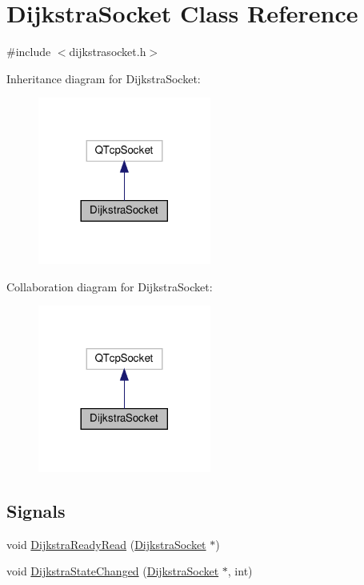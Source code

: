 \hypertarget{class_dijkstra_socket}{}\section{Dijkstra\+Socket Class Reference}
\label{class_dijkstra_socket}


{\ttfamily \#include $<$dijkstrasocket.\+h$>$}



Inheritance diagram for Dijkstra\+Socket\+:
\nopagebreak
\begin{figure}[H]
\begin{center}
\leavevmode
\includegraphics[width=161pt]{class_dijkstra_socket__inherit__graph}
\end{center}
\end{figure}


Collaboration diagram for Dijkstra\+Socket\+:
\nopagebreak
\begin{figure}[H]
\begin{center}
\leavevmode
\includegraphics[width=161pt]{class_dijkstra_socket__coll__graph}
\end{center}
\end{figure}
\subsection*{Signals}
\begin{DoxyCompactItemize}
\item 
void \hyperlink{class_dijkstra_socket_ad942276d377f42992ac9dfd5fe32219c}{Dijkstra\+Ready\+Read} (\hyperlink{class_dijkstra_socket}{Dijkstra\+Socket} $\ast$)
\item 
void \hyperlink{class_dijkstra_socket_a4527ae22be46f923b0c13eabf170e96f}{Dijkstra\+State\+Changed} (\hyperlink{class_dijkstra_socket}{Dijkstra\+Socket} $\ast$, int)
\end{DoxyCompactItemize}
